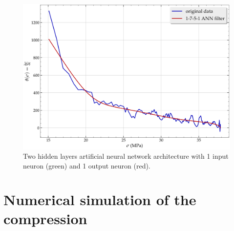 \documentclass[metals,article,submit,pdftex,moreauthors]{Definitions/mdpi}
\DeclareRobustCommand{\mdot}[1]{\accentset{\mbox{\bfseries .}}{#1}}
\DeclareRobustCommand{\RMSE}{\text{E}_\text{RMS}}
\DeclareRobustCommand{\MARE}{\text{E}_\text{MAR}}
\DeclareRobustCommand{\MPa}{\text{MPa}}
\begin{document}
\begin{figure}[H]
\centering
\includegraphics[width=0.7\columnwidth]{Figures/AnnTheta}
\caption{Two hidden layers artificial neural network architecture with 1 input neuron (green) and 1 output neuron (red).}
\label{fig:AnnTheta}
\end{figure}


\section{Numerical simulation of the compression\label{sec:NumSim}}

\end{document}
